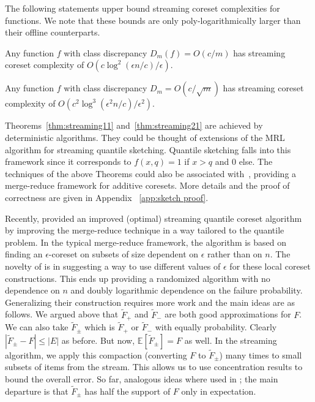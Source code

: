 \documentclass[12pt]{colt2019} %
\newcommand{\E}{\mathbb{E}}
\newcommand{\eps}{\epsilon}
\begin{document}
\noindent The following statements upper bound streaming coreset complexities for functions. We note that these bounds are only poly-logarithmically larger than their offline counterparts. 

\begin{theorem} \label{thm:streaming11}
Any function $f$ with class discrepancy $D_m(f) = O(c/m)$ has streaming coreset complexity of $O\left(c\log^2(\eps n/c)/\eps\right)$.
\end{theorem}

\begin{theorem} \label{thm:streaming21}
Any function $f$ with class discrepancy $D_m = O(c/\sqrt{m})$ has streaming coreset complexity of $O\left(c^2\log^3(\eps^2 n/c) /\eps^2\right)$.
\end{theorem}

Theorems~\ref{thm:streaming11} and~\ref{thm:streaming21} are achieved by deterministic algorithms. 
They could be thought of extensions of the MRL algorithm \cite{MRL} for streaming quantile sketching. 
Quantile sketching falls into this framework since it corresponds to $f(x,q) = 1$ if $x>q$ and $0$ else. The techniques of the above Theorems could also be associated with~\cite{matousek1995approximations}, providing a merge-reduce framework for additive coresets. 
More details and the proof of correctness are given in Appendix ~\ref{app:sketch proof}.

Recently, \cite{DBLP:conf/focs/KarninLL16} provided an improved (optimal) streaming quantile coreset algorithm by improving the merge-reduce technique in a way tailored to the quantile problem. In the typical merge-reduce framework, the algorithm is based on finding an $\eps$-coreset on subsets of size dependent on $\eps$ rather than on $n$. The novelty of \cite{DBLP:conf/focs/KarninLL16} is in suggesting a way to use different values of $\eps$ for these local coreset constructions. This ends up providing a randomized algorithm with no dependence on $n$ and doubly logarithmic dependence on the failure probability. 
%
Generalizing their construction requires more work and the main ideas are as follows. 
We argued above that $\tilde F_{+}$ and $\tilde F_{-}$ are both good approximations for $F$. 
We can also take $\tilde F_{\pm}$ which is $\tilde F_{+}$ or $\tilde F_{-}$ with equally probability. 
Clearly $|\tilde F_{\pm} - F| \le |E|$ as before. But now, $\E[\tilde F_{\pm}] = F$ as well. 
In the streaming algorithm, we apply this compaction (converting $F$ to $\tilde F_{\pm}$) many times to small subsets of items from the stream. This allows us to use concentration results to bound the overall error. So far, analogous ideas where used in \cite{DBLP:conf/focs/KarninLL16};
the main departure is that $\tilde F_{\pm}$ has half the support of $F$ only in expectation.
\end{document}
